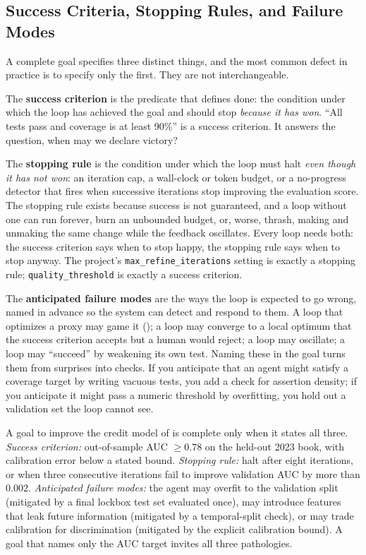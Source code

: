 \subsection{Success Criteria, Stopping Rules, and Failure Modes}\label{subsec:success-stopping-failure}

A complete goal specifies three distinct things, and the most common defect in practice is to specify only the first. They are not interchangeable.

The \textbf{success criterion} is the predicate that defines done: the condition under which the loop has achieved the goal and should stop \emph{because it has won}. ``All tests pass and coverage is at least 90\%'' is a success criterion. It answers the question, when may we declare victory?

The \textbf{stopping rule} is the condition under which the loop must halt \emph{even though it has not won}: an iteration cap, a wall-clock or token budget, or a no-progress detector that fires when successive iterations stop improving the evaluation score. The stopping rule exists because success is not guaranteed, and a loop without one can run forever, burn an unbounded budget, or, worse, thrash, making and unmaking the same change while the feedback oscillates. Every loop needs both: the success criterion says when to stop happy, the stopping rule says when to stop anyway. The project's \texttt{max\_refine\_iterations} setting is exactly a stopping rule; \texttt{quality\_threshold} is exactly a success criterion.

The \textbf{anticipated failure modes} are the ways the loop is expected to go wrong, named in advance so the system can detect and respond to them. A loop that optimizes a proxy may game it (); a loop may converge to a local optimum that the success criterion accepts but a human would reject; a loop may oscillate; a loop may ``succeed'' by weakening its own test. Naming these in the goal turns them from surprises into checks. If you anticipate that an agent might satisfy a coverage target by writing vacuous tests, you add a check for assertion density; if you anticipate it might pass a numeric threshold by overfitting, you hold out a validation set the loop cannot see.

\begin{example}\label{ex:three-components}
A goal to improve the credit model of  is complete only when it states all three. \emph{Success criterion:} out-of-sample AUC $\geq 0.78$ on the held-out 2023 book, with calibration error below a stated bound. \emph{Stopping rule:} halt after eight iterations, or when three consecutive iterations fail to improve validation AUC by more than $0.002$. \emph{Anticipated failure modes:} the agent may overfit to the validation split (mitigated by a final lockbox test set evaluated once), may introduce features that leak future information (mitigated by a temporal-split check), or may trade calibration for discrimination (mitigated by the explicit calibration bound). A goal that names only the AUC target invites all three pathologies.
\end{example}

